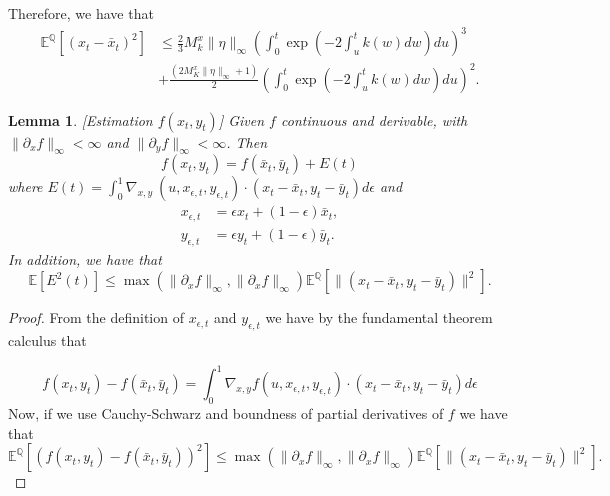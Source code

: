 \documentclass[a4paper,10pt]{article}
\newtheorem{lemma}[theorem]{Lemma}
\newcommand{\1}{\mathbf{1}}
\begin{document}
Therefore, we have that
\begin{align*}
\mathbb{E}^{\mathbb{Q}}[(x_t - \bar{x}_t)^{2}] &\leq \frac{2}{3} M^{x}_k \|\eta\|_{\infty} \left( \int_{0}^{t} \exp\left(- 2\int_{u}^{t} k(w)dw \right) du  \right)^{3}  \\
&+ \frac{(2 M^{x}_K \|\eta\|_{\infty} + 1)}{2} \left( \int_{0}^{t}  \exp\left(- 2\int_{u}^{t} k(w)dw \right) du  \right)^{2}.
\end{align*}
\begin{lemma}\label{f_x_y}[Estimation $f(x_t,y_t)$] Given $f$ continuous and derivable, with $\|\partial_x f\|_{\infty} <\infty$ and $\|\partial_y f\|_{\infty}<\infty$. Then
\begin{equation*}
f(x_t,y_t)=f(\bar{x}_t,\bar{y}_t) + E(t)
\end{equation*}
where $E(t)=\int_{0}^{1} \nabla_{x,y}\ (u, x_{\epsilon,t}, y_{\epsilon,t}) \cdot (x_t - \bar{x}_t,y_t - \bar{y}_t) d\epsilon$ and
\begin{align*}
x_{\epsilon,t} &= \epsilon x_t + (1-\epsilon) \bar{x}_t, \\
y_{\epsilon,t} &= \epsilon y_t + (1-\epsilon) \bar{y}_t.
\end{align*}
In addition, we have that 
\begin{equation*}
\mathbb{E}[E^{2}(t)] \leq \max(\|\partial_x f\|_{\infty}, \|\partial_x f\|_{\infty}) \mathbb{E}^{\mathbb{Q}}[\|(x_t - \bar{x}_t,y_t - \bar{y}_t)\|^{2}].
\end{equation*}
\end{lemma}
\begin{proof}
From the definition of $x_{\epsilon,t}$ and $y_{\epsilon,t}$ we have by the fundamental theorem calculus that

\begin{equation*}
f(x_t,y_t) - f(\bar{x}_t,\bar{y}_t) = \int_{0}^{1} \nabla_{x,y}f (u, x_{\epsilon,t}, y_{\epsilon,t})\cdot (x_t - \bar{x}_t,y_t - \bar{y}_t) d\epsilon
\end{equation*}
Now, if we use Cauchy-Schwarz and boundness of partial derivatives of $f$ we have that
\begin{equation*}
\mathbb{E}^{\mathbb{Q}}[(f(x_t,y_t) - f(\bar{x}_t,\bar{y}_t))^{2}] \leq \max(\|\partial_x f\|_{\infty}, \|\partial_x f\|_{\infty}) \mathbb{E}^{\mathbb{Q}}[\|(x_t - \bar{x}_t,y_t - \bar{y}_t)\|^{2}].
\end{equation*}

\end{proof}
\end{document}
